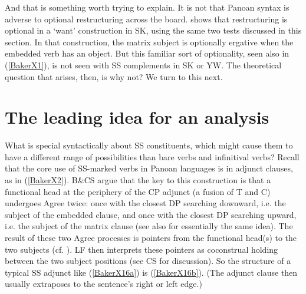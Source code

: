 \documentclass[output=paper,colorlinks,citecolor=brown,
]{langscibook}
\begin{document}
And that is something worth trying to explain. It is not that Panoan syntax is adverse to optional restructuring across the board. \cite[371-376]{Baker14} shows that restructuring is optional in a ‘want’ construction in SK, using the same two tests discussed in this section. In that construction, the matrix subject is optionally ergative when the embedded verb has an object. But this familiar sort of optionality, seen also in (\ref{BakerX1}), is not seen with SS complements in SK or YW. The theoretical question that arises, then, is why not? We turn to this next.

\section{The leading idea for an analysis}

What is special syntactically about SS constituents, which might cause them to have a different range of possibilities than bare verbs and
infinitival verbs? Recall that the core use of SS-marked verbs in Panoan languages is in adjunct clauses, as in (\ref{BakerX2}). B\&CS argue that the key to this construction is that a functional head at the periphery of the CP adjunct (a fusion of T and C) undergoes Agree twice: once with the closest DP searching downward, i.e. the subject of the embedded clause, and once with the closest DP searching upward, i.e. the subject of the matrix clause (see also \citet{arregi2019switch} for essentially the same idea). The result of these two Agree processes is pointers from the functional head(s) to the two subjects (cf. \citealt{arregi2012morphotactics}). LF then interprets these pointers as coconstrual holding between the two subject positions (see CS for discussion). So the structure of a typical SS adjunct like (\ref{BakerX16a}) is (\ref{BakerX16b}). (The adjunct clause then usually extraposes to the sentence’s right or left edge.)
\end{document}
